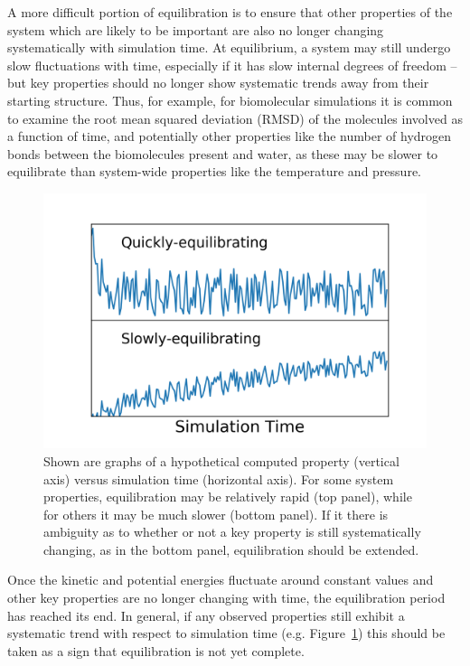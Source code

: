 \documentclass[9pt,bestpractices]{livecoms}
\begin{document}
A more difficult portion of equilibration is to ensure that other properties of the system which are likely to be important are also no longer changing systematically with simulation time.
At equilibrium, a system may still undergo slow fluctuations with time, especially if it has slow internal degrees of freedom -- but key properties should no longer show systematic trends away from their starting structure.
Thus, for example, for biomolecular simulations it is common to examine the root mean squared deviation (RMSD) of the molecules involved as a function of time, and potentially other properties like the number of hydrogen bonds between the biomolecules present and water, as these may be slower to equilibrate than system-wide properties like the temperature and pressure.

\begin{figure}[h]
\centering
\includegraphics[width=\linewidth]{Equilibration_fig.png}
\caption{Shown are graphs of a hypothetical computed property (vertical axis) versus simulation time (horizontal axis). For some system properties, equilibration may be relatively rapid (top panel), while for others it may be much slower (bottom panel). If it there is ambiguity as to whether or not a key property is still systematically changing, as in the bottom panel, equilibration should be extended.}
\label{equilibration}
\end{figure}

Once the kinetic and potential energies fluctuate around constant values and other key properties are no longer changing with time, the equilibration period has reached its end.
In general, if any observed properties still exhibit a systematic trend with respect to simulation time (e.g. Figure~\ref{equilibration}) this should be taken as a sign that equilibration is not yet complete.
\end{document}
